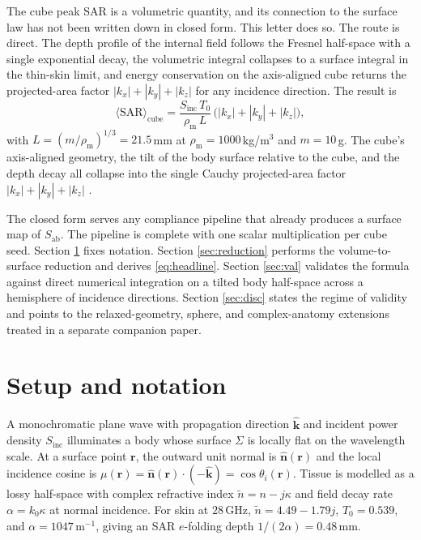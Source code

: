 \documentclass[journal,twocolumn,10pt]{IEEEtran}
\theoremstyle{plain}
\theoremstyle{remark}
\newcommand{\khat}{\hat{\bm{k}}}
\newcommand{\nhat}{\hat{\bm{n}}}
\newcommand{\rr}{\mathbf{r}}
\newcommand{\Sinc}{S_{\mathrm{inc}}}
\newcommand{\Sab}{S_{\mathrm{ab}}}
\newcommand{\rhom}{\rho_{\mathrm{m}}}
\newcommand{\ntilde}{\tilde{n}}
\begin{document}
The cube peak SAR is a volumetric quantity, and its connection to
the surface law has not been written down in closed form. This
letter does so. The route is direct. The depth profile of the
internal field follows the Fresnel half-space with a single
exponential decay, the volumetric integral collapses to a surface
integral in the thin-skin limit, and energy conservation on the
axis-aligned cube returns the projected-area factor
$|k_x|+|k_y|+|k_z|$ for any incidence direction. The result is
\begin{equation}\label{eq:headline}
  \boxed{
  \langle \mathrm{SAR} \rangle_{\mathrm{cube}}
  = \frac{\Sinc \, T_0}{\rhom \, L} \,
    \bigl(|k_x| + |k_y| + |k_z|\bigr),
  }
\end{equation}
with $L = (m / \rhom)^{1/3} = 21.5\,$mm at $\rhom = 1000\,$kg/m$^3$
and $m = 10\,$g. The cube's axis-aligned geometry, the tilt of the
body surface relative to the cube, and the depth decay all collapse
into the single Cauchy projected-area factor
$|k_x|+|k_y|+|k_z|$ \cite{Cauchy1841}.

The closed form serves any compliance pipeline that already produces
a surface map of $\Sab$. The pipeline is complete with one scalar
multiplication per cube seed. Section \ref{sec:setup} fixes
notation. Section \ref{sec:reduction} performs the volume-to-surface
reduction and derives \eqref{eq:headline}. Section \ref{sec:val}
validates the formula against direct numerical integration on a
tilted body half-space across a hemisphere of incidence directions.
Section \ref{sec:disc} states the regime of validity and points to
the relaxed-geometry, sphere, and complex-anatomy extensions
treated in a separate companion paper.


\section{Setup and notation}\label{sec:setup}

A monochromatic plane wave with propagation direction $\khat$ and
incident power density $\Sinc$ illuminates a body whose surface
$\Sigma$ is locally flat on the wavelength scale. At a surface point
$\rr$, the outward unit normal is $\nhat(\rr)$ and the local
incidence cosine is
$\mu(\rr) = \nhat(\rr) \cdot (-\khat) = \cos \theta_i(\rr)$. Tissue
is modelled as a lossy half-space with complex refractive index
$\ntilde = n - j \kappa$ and field decay rate
$\alpha = k_0 \kappa$ at normal incidence. For skin at $28\,$GHz,
$\ntilde = 4.49 - 1.79 j$, $T_0 = 0.539$, and
$\alpha = 1047\,$m$^{-1}$, giving an SAR $e$-folding depth
$1/(2\alpha) = 0.48\,$mm.
\end{document}
